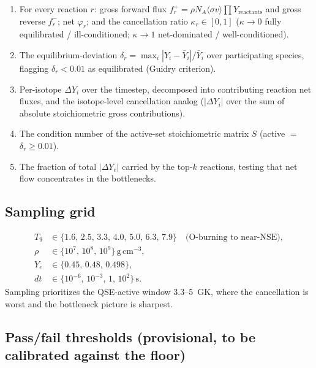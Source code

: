 \documentclass[11pt]{article}
\newcommand{\gcc}{\ensuremath{\mathrm{g\,cm^{-3}}}}
\begin{document}
\begin{enumerate}
\item For every reaction $r$: gross forward flux $f_r^+ = \rho N_A \langle\sigma v\rangle \prod Y_{\text{reactants}}$ and gross reverse $f_r^-$; net $\varphi_r$; and the cancellation ratio $\kappa_r \in [0,1]$ ($\kappa \to 0$ fully equilibrated / ill-conditioned; $\kappa \to 1$ net-dominated / well-conditioned).
\item The equilibrium-deviation $\delta_r = \max_i |Y_i - \bar{Y}_i|/\bar{Y}_i$ over participating species, flagging $\delta_r < 0.01$ as equilibrated (Guidry criterion).
\item Per-isotope $\Delta Y_i$ over the timestep, decomposed into contributing reaction net fluxes, and the isotope-level cancellation analog ($|\Delta Y_i|$ over the sum of absolute stoichiometric gross contributions).
\item The condition number of the active-set stoichiometric matrix $S$ (active $=$ $\delta_r \ge 0.01$).
\item The fraction of total $|\Delta Y_e|$ carried by the top-$k$ reactions, testing that net flow concentrates in the bottlenecks.
\end{enumerate}

\subsection{Sampling grid}

\[
\begin{aligned}
T_9 &\in \{1.6,\,2.5,\,3.3,\,4.0,\,5.0,\,6.3,\,7.9\}\quad\text{(O-burning to near-NSE)},\\
\rho &\in \{10^7,\,10^8,\,10^9\}\,\gcc,\\
Y_e &\in \{0.45,\,0.48,\,0.498\},\\
dt &\in \{10^{-6},\,10^{-3},\,1,\,10^2\}\,\text{s}.
\end{aligned}
\]
Sampling prioritizes the QSE-active window 3.3--5~GK, where the cancellation is worst and the bottleneck picture is sharpest.

\subsection{Pass/fail thresholds (provisional, to be calibrated against the floor)}
\end{document}
